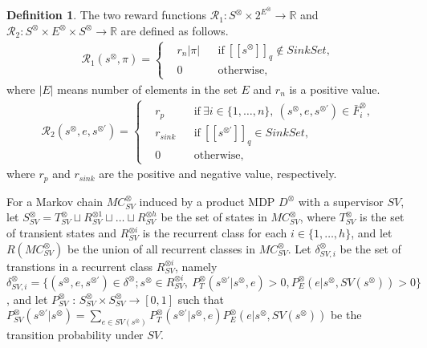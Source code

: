\documentclass[10pt]{article}
\theoremstyle{definition}
\newtheorem{definition}{Definition}
\newcommand{\myspq}{\ensuremath{[\![s^{\otimes}]\!]}_q}
\newcommand{\myspdq}{\ensuremath{[\![s^{\otimes \prime}]\!]}_q}
\begin{document}
\begin{definition}
  The two reward functions $\mathcal{R}_1 : S^{\otimes} \times 2^{E^{\otimes}} \rightarrow \mathbb{R}$ and $\mathcal{R}_2 : S^{\otimes} \times E^{\otimes} \times S^{\otimes} \rightarrow \mathbb{R}$ are defined as follows.
  \begin{align}
    \mathcal{R}_1 (s^{\otimes}, \pi) =
    \left\{
    \begin{aligned}
      & r_{n}|\pi| & &\text{if} \ \myspq \notin SinkSet , \\
      & 0 & &\text{otherwise},
    \end{aligned}
    \right.
  \end{align}
  where $|E|$ means number of elements in the set $E$ and $r_{n}$ is a positive value.
  \begin{align}
    \mathcal{R}_2(s^{\otimes}, e, s^{\otimes \prime}) =
    \left\{
    \begin{aligned}
      &r_p & & \text{if}\ \exists i \in \! \{ 1, \ldots ,n \},\ (s^{\otimes}, e, s^{\otimes \prime}) \in \bar{F}^{\otimes}_i \!,\\
      &r_{sink} & & \text{if}\ \myspdq \in SinkSet,\\
      &0 & & \text{otherwise},
    \end{aligned}
    \right.
  \end{align}
  where $r_p$ and $r_{sink}$ are the positive and negative value, respectively.
  \label{reward_def}
\end{definition}

For a Markov chain $MC^{\otimes}_{SV}$ induced by a product MDP $D^{\otimes}$ with a supervisor $SV$, let $S^{\otimes}_{SV}= T^{\otimes}_{SV} \sqcup R^{\otimes 1}_{SV} \sqcup \ldots \sqcup R^{\otimes h}_{SV}$ be the set of states in $MC^{\otimes}_{SV}$, where $T^{\otimes}_{SV}$ is the set of transient states and $R^{\otimes i}_{SV}$ is the recurrent class for each $i \in \{ 1, \ldots ,h \}$, and let $R(MC^{\otimes}_{SV})$ be the union of all recurrent classes in $MC^{\otimes}_{SV}$. Let $\delta^{\otimes}_{SV,i}$ be the set of transtions in a recurrent class $R^{\otimes i}_{SV}$, namely $\delta^{\otimes}_{SV,i} = \{ (s^{\otimes}, e, s^{\otimes \prime}) \in \delta^{\otimes} ; s^{\otimes} \in R^{\otimes i}_{SV},\ P^{\otimes}_T(s^{\otimes \prime}|s^{\otimes}, e) > 0, P^{\otimes}_E(e | s^{\otimes}, SV(s^{\otimes})) > 0 \}$, and let $P^{\otimes}_{SV}$ : $S^{\otimes}_{SV} \times S^{\otimes}_{SV} \rightarrow [0,1]$ such that $P^{\otimes}_{SV} (s^{\otimes \prime} | s^{\otimes}) = \sum_{e \in SV(s^{\otimes})} P^{\otimes}_T (s^{\otimes \prime} | s^{\otimes}, e) P^{\otimes}_E (e | s^{\otimes}, SV(s^{\otimes}))$ be the transition probability under $SV$.
\end{document}
